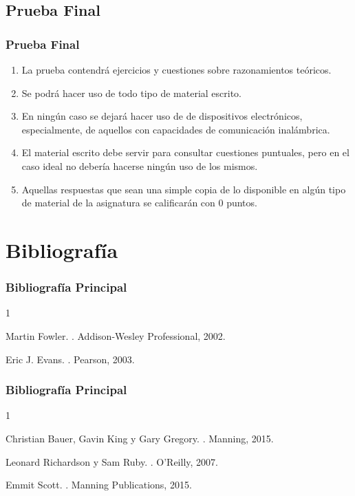 \documentclass[handout,a4paper,t,xcolor=pst,colortheme]{beamer}
\begin{document}
\subsection{Prueba Final}

\begin{frame}[c]
    \frametitle{Prueba Final}
	\begin{enumerate}[<+->]
		\item La prueba contendrá ejercicios y cuestiones sobre razonamientos teóricos.
        \item Se podrá hacer uso de todo tipo de material escrito.
        \item En ningún caso se dejará hacer uso de de dispositivos electrónicos, especialmente, de aquellos con capacidades de comunicación inalámbrica.
		\item \alert{El material escrito debe servir para consultar cuestiones puntuales, pero en el caso ideal no debería hacerse ningún uso de los mismos}.
		\item Aquellas respuestas que sean una simple copia de lo disponible en algún tipo de material de la asignatura se calificarán con 0 puntos.
	\end{enumerate}
\end{frame}

\section{Bibliografía}

\begin{frame}[c]
	\frametitle{Bibliografía Principal}
    \begin{thebibliography}{1}

Martin Fowler.
.
\newblock Addison-Wesley Professional, 2002.

Eric J. Evans.
.
\newblock Pearson, 2003.

\end{thebibliography}
\end{frame}

\begin{frame}[c]
	\frametitle{Bibliografía Principal}
	\begin{thebibliography}{1}


Christian Bauer, Gavin King y Gary Gregory.
.
\newblock  Manning, 2015.

Leonard Richardson y Sam Ruby.
.
\newblock  O'Reilly, 2007.

\bibitem{}
Emmit Scott.
.
\newblock  Manning Publications, 2015.

\end{thebibliography}
\end{frame}
\end{document}
